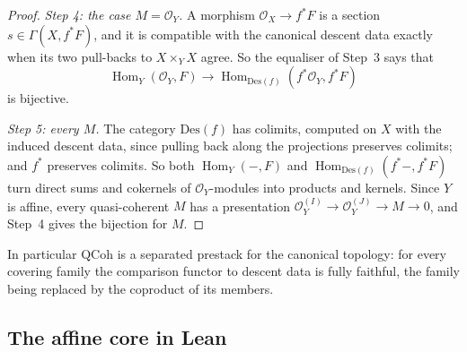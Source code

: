 \documentclass[11pt,a4paper]{amsart}
\theoremstyle{definition}
\theoremstyle{remark}
\newcommand{\QCoh}{\mathrm{QCoh}}
\newcommand{\Des}{\mathrm{Des}}
\newcommand{\Hom}{\operatorname{Hom}}
\begin{document}
\begin{proof}
\emph{Step 4: the case $M=\mathcal O_Y$.} A morphism $\mathcal O_X\to f^*F$ is a section $s\in\Gamma(X,f^*F)$, and it is compatible with the canonical descent data exactly when its two pull-backs to $X\times_YX$ agree. So the equaliser of Step~3 says that
\[
\Hom_Y(\mathcal O_Y,F)\to\Hom_{\Des(f)}(f^*\mathcal O_Y,f^*F)
\]
is bijective.

\emph{Step 5: every $M$.} The category $\Des(f)$ has colimits, computed on $X$ with the induced descent data, since pulling back along the projections preserves colimits; and $f^*$ preserves colimits. So both $\Hom_Y(-,F)$ and $\Hom_{\Des(f)}(f^*-,f^*F)$ turn direct sums and cokernels of $\mathcal O_Y$-modules into products and kernels. Since $Y$ is affine, every quasi-coherent $M$ has a presentation $\mathcal O_Y^{(I)}\to\mathcal O_Y^{(J)}\to M\to0$, and Step~4 gives the bijection for $M$.
\end{proof}

In particular $\QCoh$ is a separated prestack for the canonical topology: for every covering family the comparison functor to descent data is fully faithful, the family being replaced by the coproduct of its members.

\subsection{The affine core in Lean}\label{sec:lean}
\end{document}
